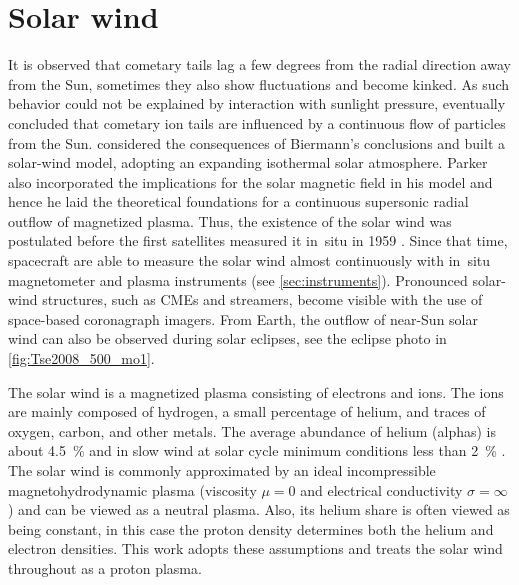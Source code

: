 \section{Solar wind}
\label{sec:solar_wind}
It is observed that cometary tails lag a few degrees from the radial direction away from the Sun, sometimes they also show fluctuations and become kinked. As such behavior could not be explained by interaction with sunlight pressure, eventually \citet{Biermann1951} concluded that cometary ion tails are influenced by a continuous flow of particles from the Sun.	%
\citet{Parker1958} considered the consequences of Biermann's conclusions and built a solar-wind model, adopting an expanding isothermal solar atmosphere. Parker also incorporated the implications for the solar magnetic field in his model and hence he laid the theoretical foundations for a continuous supersonic radial outflow of magnetized plasma. Thus, the existence of the solar wind was postulated before the first satellites measured it in~situ in 1959 \citep{Gringauz1960,Neugebauer1966}. Since that time, spacecraft are able to measure the solar wind almost continuously with in~situ magnetometer and plasma instruments (see \autoref{sec:instruments}). Pronounced solar-wind structures, such as CMEs and streamers, become visible with the use of space-based coronagraph imagers. From Earth, the outflow of near-Sun solar wind can also be observed during solar eclipses, see the eclipse photo in \autoref{fig:Tse2008_500_mo1}.

The solar wind is a magnetized plasma consisting of electrons and ions. The ions are mainly composed of hydrogen, a small percentage of helium, and traces of oxygen, carbon, and other metals. The average abundance of helium (alphas) is about \SI{4.5}{\%} and in slow wind at solar cycle minimum conditions less than \SI{2}{\%} \citep{Feldman1978,Schwenn1983,Kasper2012}.
The solar wind is commonly approximated by an ideal incompressible magnetohydrodynamic plasma (viscosity $\mu = 0$ and electrical conductivity $\sigma = \infty$) and can be viewed as a neutral plasma. Also, its helium share is often viewed as being constant, in this case the proton density determines both the helium and electron densities. This work adopts these assumptions and treats the solar wind throughout as a proton plasma.

